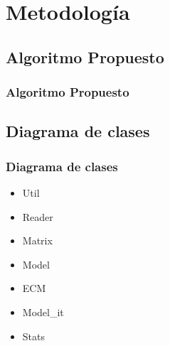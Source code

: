 \documentclass{beamer}
\begin{document}
	\section{Metodología}
        \subsection{Algoritmo Propuesto}
            \begin{frame}
            \frametitle{Algoritmo Propuesto}
            \end{frame}

            \begin{frame}
            \end{frame}
        \subsection{Diagrama de clases}
            \begin{frame}
            \frametitle{Diagrama de clases}
            \begin{itemize}
             \item Util
             \item Reader
             \item Matrix
             \item Model
             \item ECM
             \item Model\_it
             \item Stats
            \end{itemize}
            \end{frame}
\end{document}
